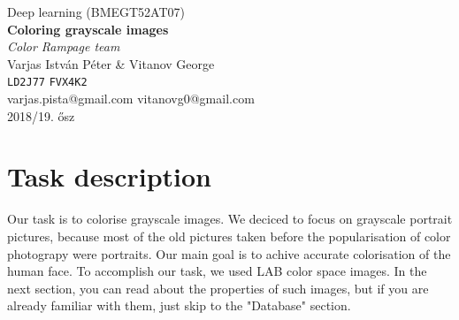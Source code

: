 \documentclass[12pt]{article}
\begin{document}
\begin{titlepage}
	\vspace*{100pt}
	\begin{center}
		{\Huge Deep learning \LARGE(BMEGT52AT07)}\\[3ex]
		{\Huge \bfseries Coloring grayscale images }\\[5ex] 
		{\LARGE \textit{Color Rampage team }}\\[10ex]
		{\LARGE Varjas István Péter \& Vitanov George}\\[2ex]
		{\Large \texttt{LD2J77} \hspace{4cm} \texttt{FVX4K2}}\\[2ex]
		{\Large varjas.pista@gmail.com \hspace{0.5cm} vitanovg0@gmail.com}\\[10ex]
		{\Large 2018/19. ősz}\\[10ex]
		\vspace{185pt}
	\end{center}
	
	\begin{figure}[h]
		\hspace{180pt}
		\label{fig:0}
	\end{figure}
	
\end{titlepage}
%
%
\newpage
\section{Task description}
Our task is to colorise grayscale images. We deciced to focus on grayscale portrait pictures, because most of the old pictures taken before the popularisation of color photograpy were portraits. Our main goal is to achive accurate colorisation of the human face.
\newline\newline\noindent
To accomplish our task, we used LAB color space images. In the next section, you can read about the properties of such images, but if you are already familiar with them, just skip to the "Database" section.
\end{document}
